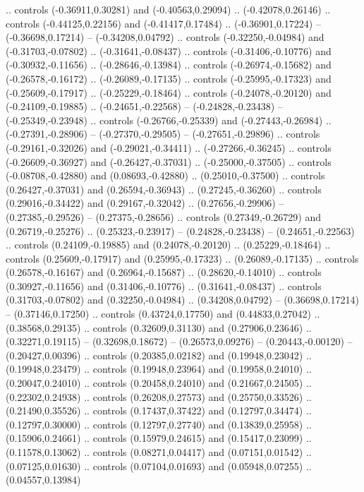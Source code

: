 {{.. controls (-0.36911,0.30281) and (-0.40563,0.29094) .. (-0.42078,0.26146)
.. controls (-0.44125,0.22156) and (-0.41417,0.17484) .. (-0.36901,0.17224)
-- (-0.36698,0.17214)
-- (-0.34208,0.04792)
.. controls (-0.32250,-0.04984) and (-0.31703,-0.07802) .. (-0.31641,-0.08437)
.. controls (-0.31406,-0.10776) and (-0.30932,-0.11656) .. (-0.28646,-0.13984)
.. controls (-0.26974,-0.15682) and (-0.26578,-0.16172) .. (-0.26089,-0.17135)
.. controls (-0.25995,-0.17323) and (-0.25609,-0.17917) .. (-0.25229,-0.18464)
.. controls (-0.24078,-0.20120) and (-0.24109,-0.19885) .. (-0.24651,-0.22568)
-- (-0.24828,-0.23438)
-- (-0.25349,-0.23948)
.. controls (-0.26766,-0.25339) and (-0.27443,-0.26984) .. (-0.27391,-0.28906)
-- (-0.27370,-0.29505)
-- (-0.27651,-0.29896)
.. controls (-0.29161,-0.32026) and (-0.29021,-0.34411) .. (-0.27266,-0.36245)
.. controls (-0.26609,-0.36927) and (-0.26427,-0.37031) .. (-0.25000,-0.37505)
.. controls (-0.08708,-0.42880) and (0.08693,-0.42880) .. (0.25010,-0.37500)
.. controls (0.26427,-0.37031) and (0.26594,-0.36943) .. (0.27245,-0.36260)
.. controls (0.29016,-0.34422) and (0.29167,-0.32042) .. (0.27656,-0.29906)
-- (0.27385,-0.29526)
-- (0.27375,-0.28656)
.. controls (0.27349,-0.26729) and (0.26719,-0.25276) .. (0.25323,-0.23917)
-- (0.24828,-0.23438)
-- (0.24651,-0.22563)
.. controls (0.24109,-0.19885) and (0.24078,-0.20120) .. (0.25229,-0.18464)
.. controls (0.25609,-0.17917) and (0.25995,-0.17323) .. (0.26089,-0.17135)
.. controls (0.26578,-0.16167) and (0.26964,-0.15687) .. (0.28620,-0.14010)
.. controls (0.30927,-0.11656) and (0.31406,-0.10776) .. (0.31641,-0.08437)
.. controls (0.31703,-0.07802) and (0.32250,-0.04984) .. (0.34208,0.04792)
-- (0.36698,0.17214)
-- (0.37146,0.17250)
.. controls (0.43724,0.17750) and (0.44833,0.27042) .. (0.38568,0.29135)
.. controls (0.32609,0.31130) and (0.27906,0.23646) .. (0.32271,0.19115)
-- (0.32698,0.18672)
-- (0.26573,0.09276)
-- (0.20443,-0.00120)
-- (0.20427,0.00396)
.. controls (0.20385,0.02182) and (0.19948,0.23042) .. (0.19948,0.23479)
.. controls (0.19948,0.23964) and (0.19958,0.24010) .. (0.20047,0.24010)
.. controls (0.20458,0.24010) and (0.21667,0.24505) .. (0.22302,0.24938)
.. controls (0.26208,0.27573) and (0.25750,0.33526) .. (0.21490,0.35526)
.. controls (0.17437,0.37422) and (0.12797,0.34474) .. (0.12797,0.30000)
.. controls (0.12797,0.27740) and (0.13839,0.25958) .. (0.15906,0.24661)
.. controls (0.15979,0.24615) and (0.15417,0.23099) .. (0.11578,0.13062)
.. controls (0.08271,0.04417) and (0.07151,0.01542) .. (0.07125,0.01630)
.. controls (0.07104,0.01693) and (0.05948,0.07255) .. (0.04557,0.13984)
}}
